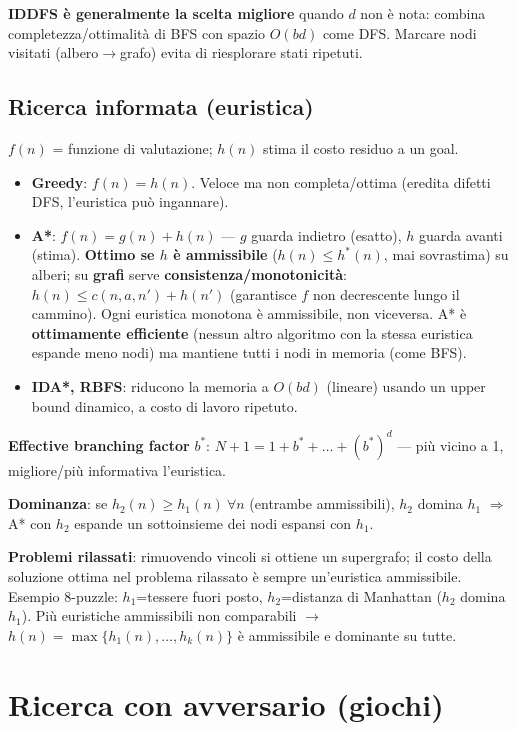 \documentclass[10pt,a4paper]{article}
\begin{document}
\textbf{IDDFS è generalmente la scelta migliore} quando $d$ non è nota: combina completezza/ottimalità di BFS con spazio $O(bd)$ come DFS. Marcare nodi visitati (albero$\to$grafo) evita di riesplorare stati ripetuti.

\subsection{Ricerca informata (euristica)}

$f(n)$ = funzione di valutazione; $h(n)$ stima il costo residuo a un goal.

\begin{itemize}
  \item \textbf{Greedy}: $f(n)=h(n)$. Veloce ma non completa/ottima (eredita difetti DFS, l'euristica può ingannare).
  \item \textbf{A*}: $f(n)=g(n)+h(n)$ --- $g$ guarda indietro (esatto), $h$ guarda avanti (stima). \textbf{Ottimo se $h$ è ammissibile} ($h(n)\le h^*(n)$, mai sovrastima) su alberi; su \textbf{grafi} serve \textbf{consistenza/monotonicità}: $h(n) \le c(n,a,n')+h(n')$ (garantisce $f$ non decrescente lungo il cammino). Ogni euristica monotona è ammissibile, non viceversa. A* è \textbf{ottimamente efficiente} (nessun altro algoritmo con la stessa euristica espande meno nodi) ma mantiene tutti i nodi in memoria (come BFS).
  \item \textbf{IDA*, RBFS}: riducono la memoria a $O(bd)$ (lineare) usando un upper bound dinamico, a costo di lavoro ripetuto.
\end{itemize}

\textbf{Effective branching factor} $b^*$: $N+1 = 1+b^*+\dots+(b^*)^d$ --- più vicino a 1, migliore/più informativa l'euristica.

\textbf{Dominanza}: se $h_2(n)\ge h_1(n)\ \forall n$ (entrambe ammissibili), $h_2$ domina $h_1$ $\Rightarrow$ A* con $h_2$ espande un sottoinsieme dei nodi espansi con $h_1$.

\textbf{Problemi rilassati}: rimuovendo vincoli si ottiene un supergrafo; il costo della soluzione ottima nel problema rilassato è sempre un'euristica ammissibile. Esempio 8-puzzle: $h_1$=tessere fuori posto, $h_2$=distanza di Manhattan ($h_2$ domina $h_1$). Più euristiche ammissibili non comparabili $\to$ $h(n)=\max\{h_1(n),\dots,h_k(n)\}$ è ammissibile e dominante su tutte.

\section{Ricerca con avversario (giochi)}
\end{document}
